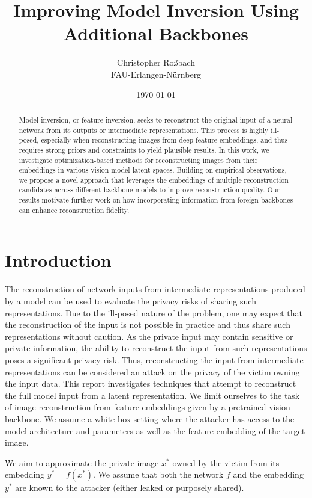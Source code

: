 \documentclass[10pt,twocolumn]{article}
\title{Improving Model Inversion Using Additional Backbones}
\author{Christopher Roßbach \\ FAU-Erlangen-Nürnberg}
\date{\today}
\begin{document}
\maketitle
\begin{abstract}
    Model inversion, or feature inversion, seeks to reconstruct the original input of a neural network from its outputs or intermediate representations.
    This process is highly ill-posed, especially when reconstructing images from deep feature embeddings, and thus requires strong priors and constraints to yield plausible results.
    In this work, we investigate optimization-based methods for reconstructing images from their embeddings in various vision model latent spaces.
    Building on empirical observations, we propose a novel approach that leverages the embeddings of multiple reconstruction candidates across different backbone models to improve reconstruction quality.
    Our results motivate further work on how incorporating information from foreign backbones can enhance reconstruction fidelity.
\end{abstract}

\section{Introduction}
The reconstruction of network inputs from intermediate representations produced by a model can be used to evaluate the privacy risks of sharing such representations.
Due to the ill-posed nature of the problem, one may expect that the reconstruction of the input is not possible in practice and thus share such representations without caution.
As the private input may contain sensitive or private information, the ability to reconstruct the input from such representations poses a significant privacy risk.
Thus, reconstructing the input from intermediate representations can be considered an attack on the privacy of the victim owning the input data.
This report investigates techniques that attempt to reconstruct the full model input from a latent representation.
We limit ourselves to the task of image reconstruction from feature embeddings given by a pretrained vision backbone.
We assume a white-box setting where the attacker has access to the model architecture and parameters as well as the feature embedding of the target image.

We aim to approximate the private image $x^*$ owned by the victim from its embedding $y^* = f(x^*)$.
We assume that both the network $f$ and the embedding $y^*$ are known to the attacker (either leaked or purposely shared).
\end{document}
